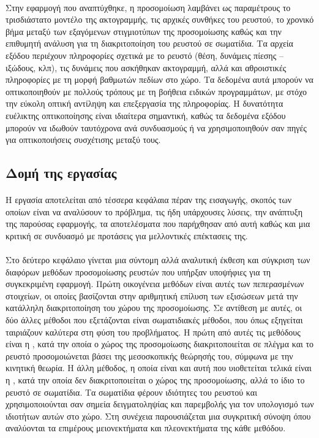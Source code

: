 \paragraph{} Στην εφαρμογή που αναπτύχθηκε, η προσομοίωση λαμβάνει ως παραμέτρους το
τρισδιάστατο μοντέλο της ακτογραμμής, τις αρχικές συνθήκες του ρευστού, το χρονικό βήμα
μεταξύ των εξαγόμενων στιγμιοτύπων της προσομοίωσης καθώς και την επιθυμητή ανάλυση για τη
διακριτοποίηση του ρευστού σε σωματίδια. Τα αρχεία εξόδου περιέχουν πληροφορίες σχετικά με
το ρευστό (θέση, δυνάμεις πίεσης -- ιξώδους, κλπ), τις δυνάμεις που ασκήθηκαν ακτογραμμή,
αλλά και αθροιστικές πληροφορίες με τη μορφή βαθμωτών πεδίων στο χώρο. Τα δεδομένα αυτά
μπορούν να οπτικοποιηθούν με πολλούς τρόπους με τη βοήθεια ειδικών προγραμμάτων, με στόχο
την εύκολη οπτική αντίληψη και επεξεργασία της πληροφορίας. Η δυνατότητα ευέλικτης
οπτικοποίησης είναι ιδιαίτερα σημαντική, καθώς τα δεδομένα εξόδου μπορούν να ιδωθούν
ταυτόχρονα ανά συνδυασμούς ή να χρησιμοποιηθούν σαν πηγές για οπτικοποιήσεις συσχέτισης
μεταξύ τους.

\subsection{Δομή της εργασίας}

\paragraph{} Η εργασία αποτελείται από τέσσερα κεφάλαια πέραν της εισαγωγής, σκοπός των
οποίων είναι να αναλύσουν το πρόβλημα, τις ήδη υπάρχουσες λύσεις, την ανάπτυξη της
πα\-ρού\-σας εφαρμογής, τα αποτελέσματα που παρήχθησαν από αυτή καθώς και μια κριτική σε
συνδυασμό με προτάσεις για μελλοντικές επέκτασεις της.

\paragraph{} Στο δεύτερο κεφάλαιο γίνεται μια σύντομη αλλά αναλυτική έκθεση και σύγκριση
των διαφόρων μεθόδων προσομοίωσης ρευστών που υπήρξαν υποψήφιες για τη συγκεκριμένη
εφαρμογή. Πρώτη οικογένεια μεθόδων είναι αυτές των πεπερασμένων στοιχείων, οι οποίες
βασίζονται στην αριθμητική επίλυση των εξισώσεων  μετά την κατάλληλη
διακριτοποίηση του χώρου της προσομοίωσης. Σε αντίθεση με αυτές, οι δύο άλλες μέθοδοι που
εξετάζονται είναι σωματιδιακές μέθοδοι, που όπως εξηγείται ταιριάζουν καλύτερα στη φύση
του προβλήματος. Η πρώτη από αυτές τις μεθόδους είναι η , κατά την
οποία ο χώρος της προσομοίωσης διακριτοποιείται σε πλέγμα και το ρευστό προσομοιώνεται
βάσει της μεσοσκοπικής θεώρησής του, σύμφωνα με την κινητική θεωρία. Η άλλη μέθοδος, η
οποία είναι και αυτή που υιοθετείται τελικά είναι η ,
κατά την οποία δεν διακριτοποιείται ο χώρος της προσομοίωσης, αλλά το ίδιο το ρευστό σε
σωματίδια. Τα σωματίδια φέρουν ιδιότητες του ρευστού και χρησιμοποιούνται σαν σημεία
δειγματοληψίας και παρεμβολής για τον υπολογισμό των ιδιοτήτων αυτών στο χώρο. Στη
συνέχεια παρουσιάζεται μια συγκριτική σύνοψη όπου αναλύονται τα επιμέρους μειονεκτήματα
και πλεονεκτήματα της κάθε μεθόδου.

